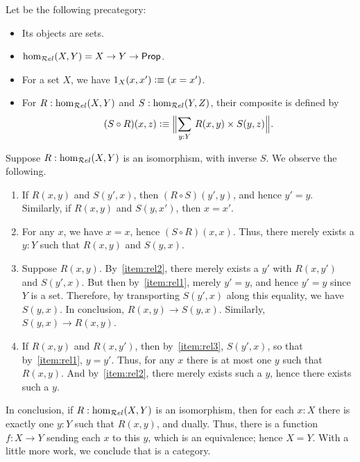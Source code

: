 \documentclass[hott-all.tex]{subfiles}
\begin{document}
\begin{eg}\label{ct:rel}
  Let \urel be the following precategory:
  \begin{itemize}
  \item Its objects are sets.
  \item $\hom_{\mathcal{R}el}(X,Y) = X\to Y\to \mathsf{Prop}$.
  \item For a set $X$, we have $1_X(x,x') \vcentcolon\equiv (x=x')$.
  \item For $R:\hom_{\mathcal{R}el}(X,Y)$ and $S:\hom_{\mathcal{R}el}(Y,Z)$, their composite is defined by
    \[ (S\circ R)(x,z) \defeq \Brck{\sm{y:Y} R(x,y) \times S(y,z)}.\]
  \end{itemize}
  Suppose $R:\hom_{\mathcal{R}el}(X,Y)$ is an isomorphism, with inverse $S$.
  We observe the following.
  \begin{enumerate}
  \item If $R(x,y)$ and $S(y',x)$, then $(R\circ S)(y',y)$, and hence $y'=y$.
    Similarly, if $R(x,y)$ and $S(y,x')$, then $x=x'$.\label{item:rel1}
  \item For any $x$, we have $x=x$, hence $(S\circ R)(x,x)$.
    Thus, there merely exists a $y:Y$ such that $R(x,y)$ and $S(y,x)$.\label{item:rel2}
  \item Suppose $R(x,y)$.
    By~\ref{item:rel2}, there merely exists a $y'$ with $R(x,y')$ and $S(y',x)$.
    But then by~\ref{item:rel1}, merely $y'=y$, and hence $y'=y$ since $Y$ is a set.
    Therefore, by transporting $S(y',x)$ along this equality, we have $S(y,x)$.
    In conclusion, $R(x,y)\to S(y,x)$.
    Similarly, $S(y,x) \to R(x,y)$.\label{item:rel3}
  \item If $R(x,y)$ and $R(x,y')$, then by~\ref{item:rel3}, $S(y',x)$, so that by~\ref{item:rel1}, $y=y'$.
    Thus, for any $x$ there is at most one $y$ such that $R(x,y)$.
    And by~\ref{item:rel2}, there merely exists such a $y$, hence there exists such a $y$.
  \end{enumerate}
  In conclusion, if $R:\hom_{\mathcal{R}el}(X,Y)$ is an isomorphism, then for each $x:X$ there is exactly one $y:Y$ such that $R(x,y)$, and dually.
  Thus, there is a function $f:X\to Y$ sending each $x$ to this $y$, which is an equivalence; hence $X=Y$.
  With a little more work, we conclude that \urel is a category.
\end{eg}

%
\end{document}
